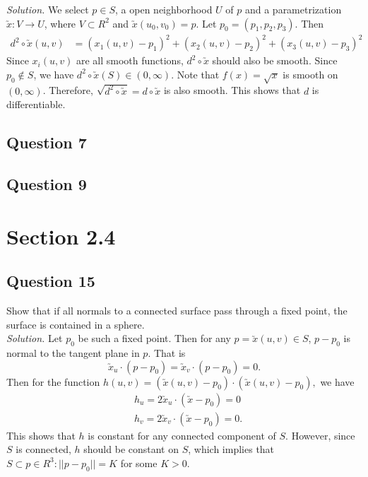 \documentclass[12pt]{article}
\begin{document}
\textit{Solution.} We select $p\in S$, a open neighborhood $U$ of $p$ and a parametrization $\utilde{x}: V \to U$, where $V\subset R^2$ and $\utilde{x}(u_0,v_0) = p$. Let $p_0=(p_1,p_2,p_3)$. Then \begin{align*}
    d^2\circ\utilde{x}(u,v) &= (x_1(u,v)-p_1)^2+(x_2(u,v)-p_2)^2+(x_3(u,v)-p_3)^2
\end{align*}
Since $x_i(u,v)$ are all smooth functions, $d^2\circ \utilde{x}$ should also be smooth. Since $p_0\notin S$, we have $d^2\circ\utilde{x}(S)\in (0,\infty)$. Note that $f(x)=\sqrt{x}$ is smooth on $(0,\infty)$. Therefore, $\sqrt{d^2\circ\utilde{x}} = d\circ\utilde{x}$ is also smooth. This shows that $d$ is differentiable.

\subsection*{Question 7}

\subsection*{Question 9}

\section{Section 2.4}

\subsection*{Question 15}
Show that if all normals to a connected surface pass through a fixed point, the surface is contained in a sphere.\\

\textit{Solution.} Let $p_0$ be such a fixed point. Then for any $p = \utilde{x}(u,v)\in S$, $p-p_0$ is normal to the tangent plane in $p$. That is \begin{equation*}
    \utilde{x}_u\cdot (p-p_0) = \utilde{x}_v\cdot (p-p_0) = 0.
\end{equation*}
Then for the function $h(u,v)=(\utilde{x}(u,v)-p_0)\cdot(\utilde{x}(u,v)-p_0),$ we have \begin{align*}
    &h_u = 2\utilde{x}_u\cdot (\utilde{x}-p_0) = 0\\
    &h_v = 2\utilde{x}_v\cdot (\utilde{x}-p_0) = 0.
\end{align*}
This shows that $h$ is constant for any connected component of $S$. However, since $S$ is connected, $h$ should be constant on $S$, which implies that $S\subset {p\in R^3:||p-p_0|| = K}$ for some $K>0$.
\end{document}
